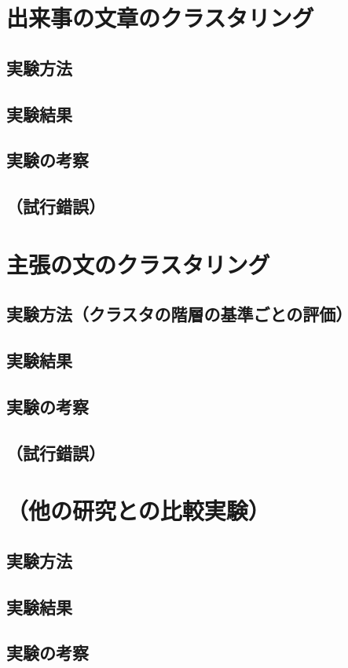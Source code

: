 \documentclass[12pt,a4j]{jreport}
\begin{document}
\section{出来事の文章のクラスタリング}
    \subsection{実験方法}
    \subsection{実験結果}
    \subsection{実験の考察}
    \subsection{（試行錯誤）}
\section{主張の文のクラスタリング}
    \subsection{実験方法（クラスタの階層の基準ごとの評価）}
    \subsection{実験結果}
    \subsection{実験の考察}
    \subsection{（試行錯誤）}
\section{（他の研究との比較実験）}
    \subsection{実験方法}
    \subsection{実験結果}
    \subsection{実験の考察}
\end{document}
